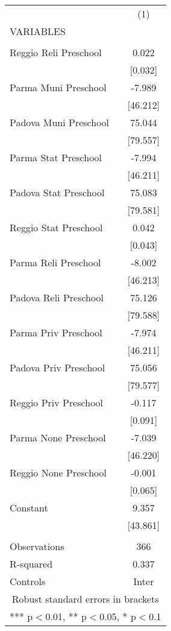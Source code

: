 \begin{tabular}{lc} \hline
 & (1) \\
VARIABLES &  \\ \hline
 &  \\
Reggio Reli Preschool & 0.022 \\
 & [0.032] \\
Parma Muni Preschool & -7.989 \\
 & [46.212] \\
Padova Muni Preschool & 75.044 \\
 & [79.557] \\
Parma Stat Preschool & -7.994 \\
 & [46.211] \\
Padova Stat Preschool & 75.083 \\
 & [79.581] \\
Reggio Stat Preschool & 0.042 \\
 & [0.043] \\
Parma Reli Preschool & -8.002 \\
 & [46.213] \\
Padova Reli Preschool & 75.126 \\
 & [79.588] \\
Parma Priv Preschool & -7.974 \\
 & [46.211] \\
Padova Priv Preschool & 75.056 \\
 & [79.577] \\
Reggio Priv Preschool & -0.117 \\
 & [0.091] \\
Parma None Preschool & -7.039 \\
 & [46.220] \\
Reggio None Preschool & -0.001 \\
 & [0.065] \\
Constant & 9.357 \\
 & [43.861] \\
 &  \\
Observations & 366 \\
R-squared & 0.337 \\
 Controls & Inter \\ \hline
\multicolumn{2}{c}{ Robust standard errors in brackets} \\
\multicolumn{2}{c}{ *** p$<$0.01, ** p$<$0.05, * p$<$0.1} \\
\end{tabular}
